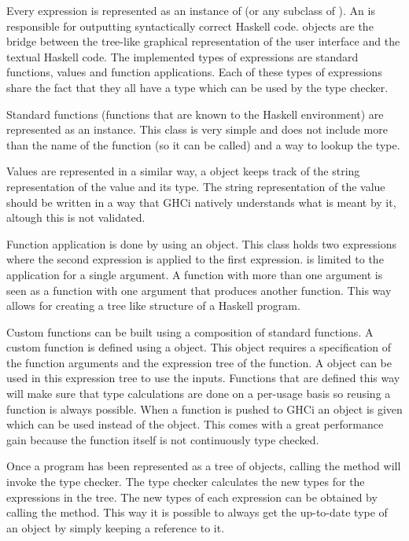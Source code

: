 Every expression is represented as an instance of  (or any subclass of ). 
An  is responsible for outputting syntactically correct Haskell code.  objects are the bridge between the tree-like graphical representation of the user interface and the textual Haskell code.
The implemented types of expressions are standard functions, values and function applications.
Each of these types of expressions share the fact that they all have a type which can be used by the type checker.

Standard functions (functions that are known to the Haskell environment) are represented as an  instance. 
This class is very simple and does not include more than the name of the function (so it can be called) and a way to lookup the type.

Values are represented in a similar way, a  object keeps track of the string representation of the value and its type. 
The string representation of the value should be written in a way that GHCi natively understands what is meant by it, altough this is not validated.

Function application is done by using an  object. 
This class holds two expressions where the second expression is applied to the first expression.
 is limited to the application for a single argument.
A function with more than one argument is seen as a function with one argument that produces another function.
This way  allows for creating a tree like structure of a Haskell program.

Custom functions can be built using a composition of standard functions.
A custom function is defined using a  object.
This object requires a specification of the function arguments and the expression tree of the function.
A  object can be used in this expression tree to use the inputs.
Functions that are defined this way will make sure that type calculations are done on a per-usage basis so reusing a function is always possible.
When a function is pushed to GHCi an  object is given which can be used instead of the  object.
This comes with a great performance gain because the function itself is not continuously type checked.

Once a program has been represented as a tree of  objects, calling the  method will invoke the type checker.
The type checker calculates the new types for the expressions in the tree.
The new types of each expression can be obtained by calling the  method.
This way it is possible to always get the up-to-date type of an  object by simply keeping a reference to it.

